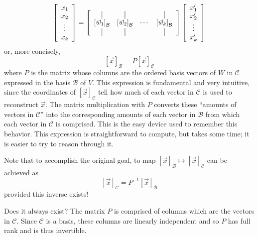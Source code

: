 \begin{equation}
\left[\begin{array}{c} x_1 \\ x_2 \\ \vdots \\ x_k \end{array}\right] = \left[ \begin{array}{cccc}
	\vertbar & \vertbar & & \vertbar \\
	\left[\vec{w}_1\right]_{\mathcal{B}} & \left[\vec{w}_2\right]_{\mathcal{B}} & \cdots & \left[\vec{w}_k\right]_{\mathcal{B}} \\
	\vertbar & \vertbar & & \vertbar
\end{array}\right] \left[ \begin{array}{c} x_1' \\ x_2' \\ \vdots \\ x_k' \end{array}\right]
\end{equation}
or, more concisely,
\[ \left[\vec{x}\right]_{\mathcal{B}} = P \left[ \vec{x}\right]_{\mathcal{C}} \]
where $P$ is the matrix whose columns are the ordered basis vectors of $W$ in $\mathcal{C}$ expressed in the basis $\mathcal{B}$ of $V$. This expression is fundamental and very intuitive, since the coordinates of $\left[ \vec{x} \right]_{\mathcal{C}}$ tell how much of each vector in $\mathcal{C}$ is used to reconstruct $\vec{x}$. The matrix multiplication with $P$ converts these ``amounts of vectors in $\mathcal{C}$'' into the corresponding amounts of each vector in $\mathcal{B}$ from which each vector in $\mathcal{C}$ is comprised. This is the easy device used to remember this behavior. This expression is straightforward to compute, but takes some time; it is easier to try to reason through it.

Note that to accomplish the original goal, to map $\left[ \vec{x}\right]_{\mathcal{B}} \mapsto \left[\vec{x}\right]_{\mathcal{C}} $ can be achieved as \[ \left[\vec{x}\right]_{\mathcal{C}} = P^{-1} \left[ \vec{x} \right]_{\mathcal{B}} \] provided this inverse exists! 

Does it always exist? The matrix $P$ is comprised of columns which are the vectors in $\mathcal{C}$. Since $\mathcal{C}$ is a basis, these columns are linearly independent and so $P$ has full rank and is thus invertible. 

